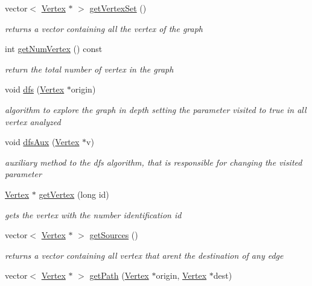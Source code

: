 \begin{DoxyCompactItemize}
vector$<$ \hyperlink{class_vertex}{Vertex} $\ast$ $>$ \hyperlink{class_graph_ad9c74e7d666e95408940610429f7a59a}{get\+Vertex\+Set} ()
\begin{DoxyCompactList}\small\item\em returns a vector containing all the vertex of the graph \end{DoxyCompactList}\item 
int \hyperlink{class_graph_abb5e0517e2979c54eebdafc2a9875e8f}{get\+Num\+Vertex} () const
\begin{DoxyCompactList}\small\item\em return the total number of vertex in the graph \end{DoxyCompactList}\item 
void \hyperlink{class_graph_adb546d755f7529e114566bb27e91272e}{dfs} (\hyperlink{class_vertex}{Vertex} $\ast$origin)
\begin{DoxyCompactList}\small\item\em algorithm to explore the graph in depth setting the parameter visited to true in all vertex analyzed \end{DoxyCompactList}\item 
void \hyperlink{class_graph_ae2d00529a368c8651c378857852c9946}{dfs\+Aux} (\hyperlink{class_vertex}{Vertex} $\ast$v)
\begin{DoxyCompactList}\small\item\em auxiliary method to the dfs algorithm, that is responsible for changing the visited parameter \end{DoxyCompactList}\item 
\hyperlink{class_vertex}{Vertex} $\ast$ \hyperlink{class_graph_a0d47743637a652f8e3ba84f5d83118f3}{get\+Vertex} (long id)
\begin{DoxyCompactList}\small\item\em gets the vertex with the number identification id \end{DoxyCompactList}\item 
vector$<$ \hyperlink{class_vertex}{Vertex} $\ast$ $>$ \hyperlink{class_graph_a920bec27ba394f02f3d6b3aeefd7a8b0}{get\+Sources} ()
\begin{DoxyCompactList}\small\item\em returns a vector containing all vertex that aren\textquotesingle{}t the destination of any edge \end{DoxyCompactList}\item 
vector$<$ \hyperlink{class_vertex}{Vertex} $\ast$ $>$ \hyperlink{class_graph_a02923471911e67d955d3334e77fb4ab0}{get\+Path} (\hyperlink{class_vertex}{Vertex} $\ast$origin, \hyperlink{class_vertex}{Vertex} $\ast$dest)

\end{DoxyCompactItemize}
